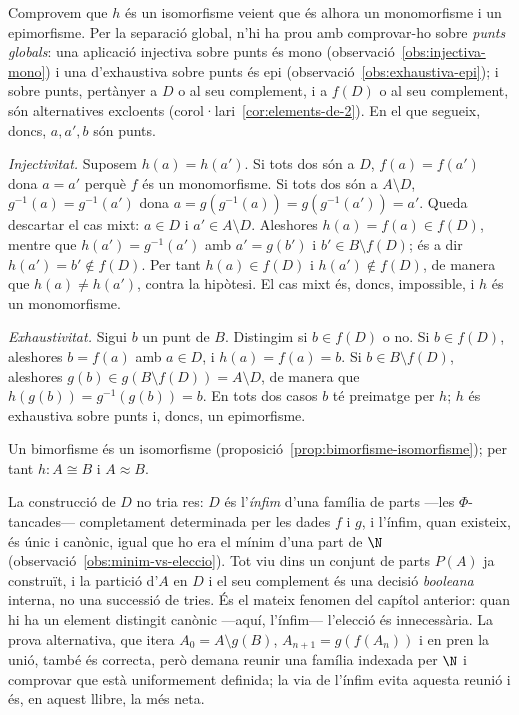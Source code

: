 \begin{prova}
Comprovem que \(h\) és un isomorfisme veient que és alhora un monomorfisme
i un epimorfisme. Per la separació global, n'hi ha prou amb comprovar-ho
sobre \emph{punts globals}: una aplicació injectiva sobre punts és mono
(observació~\ref{obs:injectiva-mono}) i una d'exhaustiva sobre punts és
epi (observació~\ref{obs:exhaustiva-epi}); i sobre punts, pertànyer a
\(D\) o al seu complement, i a \(f(D)\) o al seu complement, són
alternatives excloents (corol·lari~\ref{cor:elements-de-2}). En el que
segueix, doncs, \(a,a',b\) són punts.

\emph{Injectivitat.} Suposem \(h(a)=h(a')\). Si tots dos són a \(D\),
\(f(a)=f(a')\) dona \(a=a'\) perquè \(f\) és un monomorfisme. Si tots dos són
a \(A\setminus D\), \(g^{-1}(a)=g^{-1}(a')\) dona \(a=g(g^{-1}(a))=
g(g^{-1}(a'))=a'\). Queda descartar el cas mixt: \(a\in D\) i \(a'\in
A\setminus D\). Aleshores \(h(a)=f(a)\in f(D)\), mentre que
\(h(a')=g^{-1}(a')\) amb \(a'=g(b')\) i \(b'\in B\setminus f(D)\); és a dir
\(h(a')=b'\notin f(D)\). Per tant \(h(a)\in f(D)\) i \(h(a')\notin f(D)\), de
manera que \(h(a)\neq h(a')\), contra la hipòtesi. El cas mixt és, doncs,
impossible, i \(h\) és un monomorfisme.

\emph{Exhaustivitat.} Sigui \(b\) un punt de \(B\). Distingim si
\(b\in f(D)\) o no. Si \(b\in f(D)\), aleshores \(b=f(a)\) amb
\(a\in D\), i \(h(a)=f(a)=b\). Si \(b\in B\setminus f(D)\), aleshores
\(g(b)\in g(B\setminus f(D))=A\setminus D\), de manera que
\(h(g(b))=g^{-1}(g(b))=b\). En tots dos casos \(b\) té preimatge per \(h\);
\(h\) és exhaustiva sobre punts i, doncs, un epimorfisme.

Un bimorfisme és un isomorfisme
(proposició~\ref{prop:bimorfisme-isomorfisme}); per tant \(h\colon A\cong
B\) i \(A\approx B\).
\end{prova}

\begin{observacio}\label{obs:sb-sense-eleccio}
La construcció de \(D\) no tria res: \(D\) és l'\emph{ínfim} d'una família de
parts ---les \(\Phi\)-tancades--- completament determinada per les dades
\(f\) i \(g\), i l'ínfim, quan existeix, és únic i canònic, igual que ho era
el mínim d'una part de \(\N\) (observació~\ref{obs:minim-vs-eleccio}). Tot
viu dins un conjunt de parts \(P(A)\) ja construït, i la partició d'\(A\) en
\(D\) i el seu complement és una decisió \emph{booleana} interna, no una
successió de tries. És el mateix fenomen del capítol anterior: quan hi ha un
element distingit canònic ---aquí, l'ínfim--- l'elecció és innecessària. La
prova alternativa, que itera \(A_0=A\setminus g(B)\), \(A_{n+1}=g(f(A_n))\) i
en pren la unió, també és correcta, però demana reunir una família indexada
per \(\N\) i comprovar que està uniformement definida; la via de l'ínfim
evita aquesta reunió i és, en aquest llibre, la més neta.
\end{observacio}

